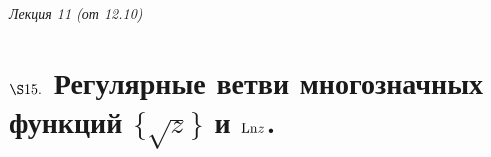 \begin{flushright}
    \textit{Лекция 11 (от 12.10)}
\end{flushright}
\section{$\S 15.$ Регулярные ветви многозначных функций $\{\sqrt{z}\}$ и $\mathrm{Ln} z$.}
